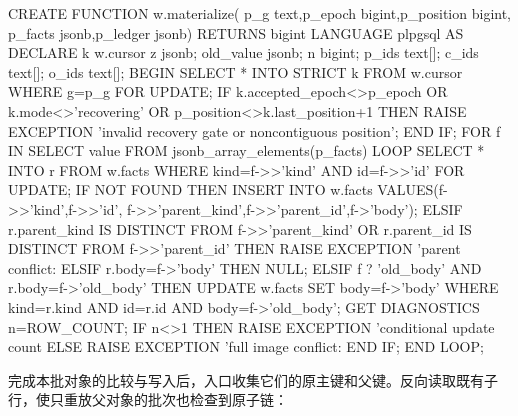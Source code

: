 \begin{BookCode}
CREATE FUNCTION w.materialize(
 p_g text,p_epoch bigint,p_position bigint,
 p_facts jsonb,p_ledger jsonb) RETURNS bigint
 LANGUAGE plpgsql AS $$
DECLARE k w.cursor%
        z jsonb; old_value jsonb; n bigint;
        p_ids text[]; c_ids text[]; o_ids text[];
BEGIN
 SELECT * INTO STRICT k FROM w.cursor WHERE g=p_g FOR UPDATE;
 IF k.accepted_epoch<>p_epoch OR k.mode<>'recovering'
    OR p_position<>k.last_position+1 THEN
   RAISE EXCEPTION 'invalid recovery gate or noncontiguous position';
 END IF;
 FOR f IN SELECT value FROM jsonb_array_elements(p_facts) LOOP
   SELECT * INTO r FROM w.facts
    WHERE kind=f->>'kind' AND id=f->>'id' FOR UPDATE;
   IF NOT FOUND THEN
     INSERT INTO w.facts VALUES(f->>'kind',f->>'id',
       f->>'parent_kind',f->>'parent_id',f->'body');
   ELSIF r.parent_kind IS DISTINCT FROM f->>'parent_kind'
      OR r.parent_id IS DISTINCT FROM f->>'parent_id' THEN
     RAISE EXCEPTION 'parent conflict: %
   ELSIF r.body=f->'body' THEN
     NULL;
   ELSIF f ? 'old_body' AND r.body=f->'old_body' THEN
     UPDATE w.facts SET body=f->'body'
      WHERE kind=r.kind AND id=r.id AND body=f->'old_body';
     GET DIAGNOSTICS n=ROW_COUNT;
     IF n<>1 THEN RAISE EXCEPTION 'conditional update count %
   ELSE
     RAISE EXCEPTION 'full image conflict: %
   END IF;
 END LOOP;
\end{BookCode}

完成本批对象的比较与写入后，入口收集它们的原主键和父键。反向读取既有子行，使只重放父对象的批次也检查到原子链：

